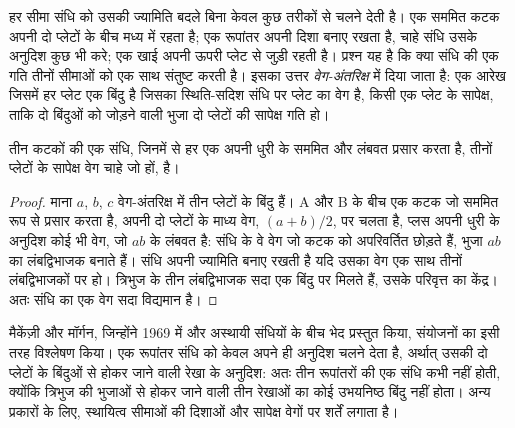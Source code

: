 हर सीमा संधि को उसकी ज्यामिति बदले बिना केवल कुछ तरीकों से चलने देती है। एक सममित कटक अपनी दो प्लेटों के बीच मध्य में रहता है; एक रूपांतर अपनी दिशा बनाए रखता है, चाहे संधि उसके अनुदिश कुछ भी करे; एक खाई अपनी ऊपरी प्लेट से जुड़ी रहती है। प्रश्न यह है कि क्या संधि की एक गति तीनों सीमाओं को एक साथ संतुष्ट करती है। इसका उत्तर \emph{वेग-अंतरिक्ष} में दिया जाता है: एक आरेख जिसमें हर प्लेट एक बिंदु है जिसका स्थिति-सदिश संधि पर प्लेट का वेग है, किसी एक प्लेट के सापेक्ष, ताकि दो बिंदुओं को जोड़ने वाली भुजा दो प्लेटों की सापेक्ष गति हो।

\begin{proposition}\label{prop:b1:plate-kinematics:rrr}
तीन कटकों की एक संधि, जिनमें से हर एक अपनी धुरी के सममित और लंबवत प्रसार करता है, तीनों प्लेटों के सापेक्ष वेग चाहे जो हों,  है।
\end{proposition}

\begin{proof}
माना $a$, $b$, $c$ वेग-अंतरिक्ष में तीन प्लेटों के बिंदु हैं। A और B के बीच एक कटक जो सममित रूप से प्रसार करता है, अपनी दो प्लेटों के माध्य वेग, $(a + b)/2$, पर चलता है, प्लस अपनी धुरी के अनुदिश कोई भी वेग, जो $ab$ के लंबवत है: संधि के वे वेग जो कटक को अपरिवर्तित छोड़ते हैं, भुजा $ab$ का लंबद्विभाजक बनाते हैं। संधि अपनी ज्यामिति बनाए रखती है यदि उसका वेग एक साथ तीनों लंबद्विभाजकों पर हो। त्रिभुज के तीन लंबद्विभाजक सदा एक बिंदु पर मिलते हैं, उसके परिवृत्त का केंद्र। अतः संधि का एक वेग सदा विद्यमान है।
\end{proof}

मैकेंज़ी और मॉर्गन, जिन्होंने 1969 में  और अस्थायी संधियों के बीच भेद प्रस्तुत किया, संयोजनों का इसी तरह विश्लेषण किया। एक रूपांतर संधि को केवल अपने ही अनुदिश चलने देता है, अर्थात् उसकी दो प्लेटों के बिंदुओं से होकर जाने वाली रेखा के अनुदिश: अतः तीन रूपांतरों की एक संधि कभी  नहीं होती, क्योंकि त्रिभुज की भुजाओं से होकर जाने वाली तीन रेखाओं का कोई उभयनिष्ठ बिंदु नहीं होता। अन्य प्रकारों के लिए, स्थायित्व सीमाओं की दिशाओं और सापेक्ष वेगों पर शर्तें लगाता है।

